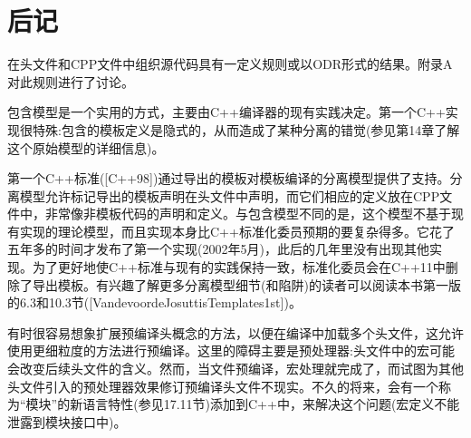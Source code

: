 \section{后记}
在头文件和CPP文件中组织源代码具有一定义规则或以ODR形式的结果。附录A对此规则进行了讨论。

包含模型是一个实用的方式，主要由C++编译器的现有实践决定。第一个C++实现很特殊:包含的模板定义是隐式的，从而造成了某种分离的错觉(参见第14章了解这个原始模型的详细信息)。

第一个C++标准([C++98])通过导出的模板对模板编译的分离模型提供了支持。分离模型允许标记导出的模板声明在头文件中声明，而它们相应的定义放在CPP文件中，非常像非模板代码的声明和定义。与包含模型不同的是，这个模型不基于现有实现的理论模型，而且实现本身比C++标准化委员预期的要复杂得多。它花了五年多的时间才发布了第一个实现(2002年5月)，此后的几年里没有出现其他实现。为了更好地使C++标准与现有的实践保持一致，标准化委员会在C++11中删除了导出模板。有兴趣了解更多分离模型细节(和陷阱)的读者可以阅读本书第一版的6.3和10.3节([VandevoordeJosuttisTemplates1st])。

有时很容易想象扩展预编译头概念的方法，以便在编译中加载多个头文件，这允许使用更细粒度的方法进行预编译。这里的障碍主要是预处理器:头文件中的宏可能会改变后续头文件的含义。然而，当文件预编译，宏处理就完成了，而试图为其他头文件引入的预处理器效果修订预编译头文件不现实。不久的将来，会有一个称为“模块”的新语言特性(参见17.11节)添加到C++中，来解决这个问题(宏定义不能泄露到模块接口中)。